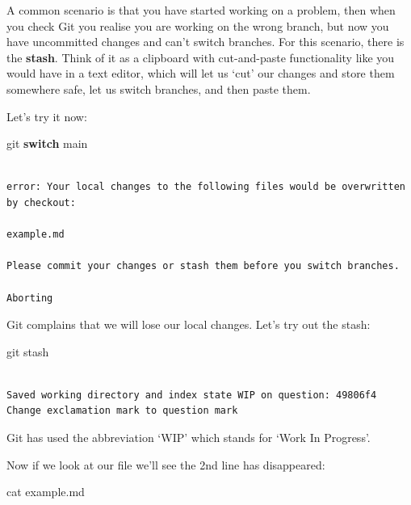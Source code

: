 \documentclass[
  letterpaper,
  DIV=11,
  numbers=noendperiod]{scrartcl}
\newenvironment{Shaded}{\begin{snugshade}}{\end{snugshade}}
\newcommand{\ControlFlowTok}[1]{\textcolor[rgb]{0.00,0.23,0.31}{\textbf{#1}}}
\newcommand{\NormalTok}[1]{\textcolor[rgb]{0.00,0.23,0.31}{#1}}
\begin{document}
A common scenario is that you have started working on a problem, then
when you check Git you realise you are working on the wrong branch, but
now you have uncommitted changes and can't switch branches. For this
scenario, there is the \textbf{stash}. Think of it as a clipboard with
cut-and-paste functionality like you would have in a text editor, which
will let us `cut' our changes and store them somewhere safe, let us
switch branches, and then paste them.

Let's try it now:

\begin{Shaded}
\begin{Highlighting}[]
\NormalTok{git }\ControlFlowTok{switch}\NormalTok{ main}
\end{Highlighting}
\end{Shaded}

\begin{verbatim}

error: Your local changes to the following files would be overwritten by checkout:

example.md

Please commit your changes or stash them before you switch branches.

Aborting
\end{verbatim}

Git complains that we will lose our local changes. Let's try out the
stash:

\begin{Shaded}
\begin{Highlighting}[]
\NormalTok{git stash}
\end{Highlighting}
\end{Shaded}

\begin{verbatim}

Saved working directory and index state WIP on question: 49806f4 Change exclamation mark to question mark
\end{verbatim}

Git has used the abbreviation `WIP' which stands for `Work In Progress'.

Now if we look at our file we'll see the 2nd line has disappeared:

\begin{Shaded}
\begin{Highlighting}[]
\NormalTok{cat example.md}
\end{Highlighting}
\end{Shaded}
\end{document}
